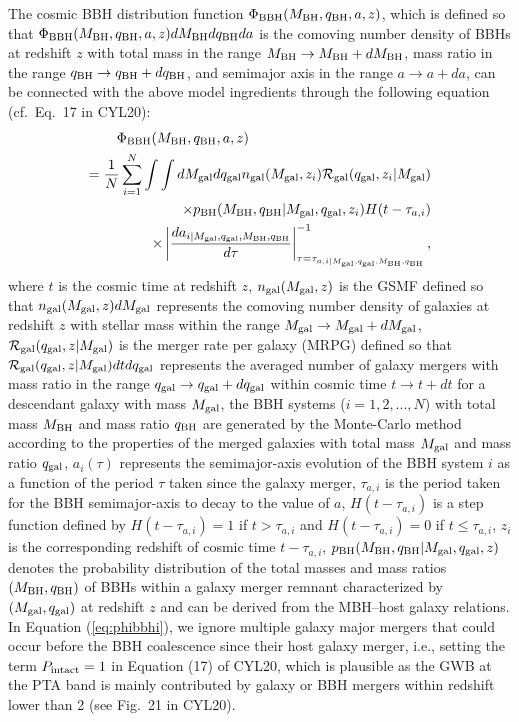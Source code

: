 \documentclass[twocolumn]{aastex631}
\newcommand{\calR}{{\mathcal{R}}}
\newcommand{\gal}{_{\rm gal}}
\newcommand{\bbh}{_{\rm BBH}}
\newcommand{\bh}{_{\rm BH}}
\begin{document}
The cosmic BBH distribution function $\Phi\bbh(M\bh,q\bh,a,z)$, which is
defined so that $\Phi\bbh(M\bh,q\bh,a,z)dM\bh dq\bh da$ is the comoving number
density of BBHs at redshift $z$ with total mass in the range $M\bh\rightarrow
M\bh+dM\bh$, mass ratio in the range $q\bh\rightarrow q\bh+dq\bh$, and
semimajor axis in the range $a\rightarrow a+da$, can be
connected with the above model ingredients through the following
equation (cf.\ Eq.~17 in CYL20):
\begin{eqnarray}
 \Phi\bbh(M\bh,q\bh,a,z)  \quad \quad \quad \quad \quad \quad \quad \quad \quad \quad \quad \quad \quad & \nonumber \\
=  \frac{1}{N} \sum_{i=1}^{N}
\int \int d M\gal d q\gal n\gal(M\gal,z_i)
\calR\gal(q\gal,z_i|M\gal) & \nonumber \\ 
 \times p\bh(M\bh,q\bh|M\gal,q\gal,z_i) 
H(t-\tau_{a,i}) & \nonumber \\
\times \left| \frac{da_{i|M\gal,q\gal,M\bh,q\bh}}{d\tau}\right|^{-1}_{\tau
=\tau_{a,i|M\gal,q\gal,M\bh,q\bh}}, & \nonumber \\
\label{eq:phibbhi}
\end{eqnarray}
%
where $t$ is the cosmic time at redshift $z$, $n\gal(M\gal,z)$ is the GSMF defined so that $n\gal(M\gal,z) dM\gal$
represents the comoving number density of galaxies at redshift $z$ with stellar
mass within the range $M\gal \rightarrow M\gal+dM\gal$,
$\calR\gal(q\gal,z|M\gal)$ is the merger rate per galaxy (MRPG) defined so that
$\calR\gal(q\gal,z|M\gal) dt dq\gal$ represents the averaged number of galaxy
mergers with mass ratio in the range $q\gal \rightarrow q\gal+dq\gal$ within
cosmic time $t \rightarrow t+dt$ for a descendant galaxy with mass $M\gal$, the
BBH systems ($i = 1, 2, ..., N$) with total mass $M\bh$ and mass ratio
$q\bh$ are generated by the Monte-Carlo method according to the properties of
the merged galaxies with total mass $M\gal$ and mass ratio $q\gal$, $a_i(\tau)$
represents the semimajor-axis evolution of the BBH system $i$ as a function of
the
period $\tau$ taken since the galaxy merger, $\tau_{a,i}$ is the period taken
for the BBH semimajor-axis to decay to the value of $a$, $H(t-\tau_{a,i})$ is a
step function defined by $H(t-\tau_{a,i})=1$ if $t>\tau_{a,i}$ and
$H(t-\tau_{a,i})=0$ if $t\le\tau_{a,i}$, $z_i$ is the corresponding redshift of
cosmic time $t-\tau_{a,i}$, $p\bh(M\bh,q\bh|M\gal,q\gal,z)$ denotes the
probability distribution of the total masses and mass ratios $(M\bh,q\bh)$ of
BBHs within a galaxy merger remnant characterized by $(M\gal,q\gal)$ at
redshift $z$ and can be derived from the MBH--host galaxy relations.
In Equation (\ref{eq:phibbhi}), we ignore multiple galaxy major mergers that
could occur before the BBH coalescence since their host galaxy merger, i.e.,
setting the term $P_{\rm intact}=1$ in Equation (17) of CYL20, which is
plausible as the GWB at the PTA band is mainly contributed by galaxy or BBH
mergers within redshift lower than 2 (see Fig.~21 in CYL20).
\end{document}
